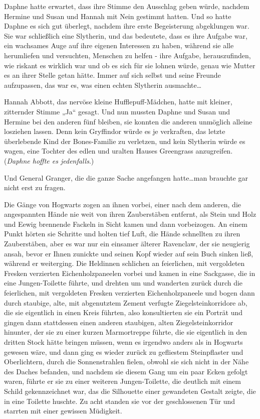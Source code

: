 {Daphne hatte erwartet, dass ihre Stimme den Ausschlag geben würde, nachdem Hermine und Susan und Hannah mit Nein gestimmt hatten. Und so hatte Daphne es sich gut überlegt, nachdem ihre erste Begeisterung abgeklungen war. Sie war schließlich eine Slytherin, und das bedeutete, dass es ihre Aufgabe war, ein wachsames Auge auf ihre eigenen Interessen zu haben, während sie alle herumliefen und versuchten, Menschen zu helfen - ihre Aufgabe, herauszufinden, wie riskant es wirklich war und ob es sich für sie lohnen würde, genau wie Mutter es an ihrer Stelle getan hätte. Immer auf sich selbst und seine Freunde aufzupassen, das war es, was einen echten Slytherin ausmachte…

Hannah Abbott, das nervöse kleine Hufflepuff-Mädchen, hatte mit kleiner, zitternder Stimme „Ja“ gesagt. Und nun mussten Daphne und Susan und Hermine bei den anderen fünf bleiben, sie konnten die anderen unmöglich alleine losziehen lassen. Denn kein Gryffindor würde es je verkraften, das letzte überlebende Kind der Bones-Familie zu verletzen, und kein Slytherin würde es wagen, eine Tochter des edlen und uralten Hauses Greengrass anzugreifen. (\emph{Daphne hoffte es jedenfalls}.)

Und General Granger, die die ganze Sache angefangen hatte…man brauchte gar nicht erst zu fragen.

Die Gänge von Hogwarts zogen an ihnen vorbei, einer nach dem anderen, die angespannten Hände nie weit von ihren Zauberstäben entfernt, als Stein und Holz und Eewig brennende Fackeln in Sicht kamen und dann vorbeizogen. An einem Punkt hörten sie Schritte und holten tief Luft, die Hände schnellten zu ihren Zauberstäben, aber es war nur ein einsamer älterer Ravenclaw, der sie neugierig ansah, bevor er Ihnen zunickte und seinen Kopf wieder auf sein Buch sinken ließ, während er weiterging. Die Heldinnen schlichen an feierlichen, mit vergoldeten Fresken verzierten Eichenholzpaneelen vorbei und kamen in eine Sackgasse, die in eine Jungen-Toilette führte, und drehten um und wanderten zurück durch die feierlichen, mit vergoldeten Fresken verzierten Eichenholzpaneele und bogen dann durch staubige, alte, mit abgenutztem Zement verfugte Ziegelsteinkorridore ab, die sie eigentlich in einen Kreis führten, also konsultierten sie ein Porträt und gingen dann stattdessen einen anderen staubigen, alten Ziegelsteinkorridor hinunter, der sie zu einer kurzen Marmortreppe führte, die sie eigentlich in den dritten Stock hätte bringen müssen, wenn es irgendwo anders als in Hogwarts gewesen wäre, und dann ging es wieder zurück zu gefliestem Steinpflaster und Oberlichtern, durch die Sonnenstrahlen fielen, obwohl sie sich nicht in der Nähe des Daches befanden, und nachdem sie diesem Gang um ein paar Ecken gefolgt waren, führte er sie zu einer weiteren Jungen-Toilette, die deutlich mit einem Schild gekennzeichnet war, das die Silhouette einer gewandeten Gestalt zeigte, die in eine Toilette huschte. Zu acht standen sie vor der geschlossenen Tür und starrten mit einer gewissen Müdigkeit.

}
